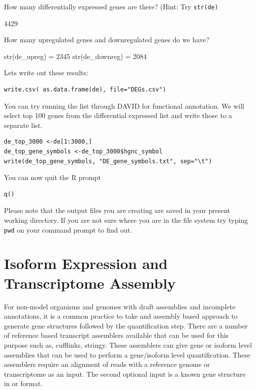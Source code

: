 \begin{questions}
How many differentially expressed genes are there? (Hint: Try \texttt{str(de)}
\begin{answer}
4429
\end{answer}

How many upregulated genes and downregulated genes do we have?
\begin{answer}
str(de\_upreg) = 2345
str(de\_downreg) = 2084
\end{answer}

\end{questions}

\begin{steps}
Lets write out these results:
\begin{lstlisting}
write.csv( as.data.frame(de), file="DEGs.csv")
\end{lstlisting}
You can try running the list through DAVID for functional annotation.
We will select top 100 genes from the differential expressed list and write those to a separate list.

\begin{lstlisting}
de_top_3000 <-de[1:3000,]
de_top_gene_symbols <-de_top_3000$hgnc_symbol
write(de_top_gene_symbols, "DE_gene_symbols.txt", sep="\t")
\end{lstlisting}

You can now quit the R prompt
\begin{lstlisting}
q()
\end{lstlisting}
\end{steps}

\begin{note}
Please note that the output files you are creating are saved in your present working directory. If you are not sure where you are in the file system try typing \texttt{pwd} on your command prompt to find out.
\end{note}



\newpage
\section{Isoform Expression and Transcriptome Assembly}

\begin{information}
For non-model organisms and genomes with draft assemblies and incomplete annotations, it is a common practice to take and assembly based approach to generate gene structures followed by the quantification step. There are a number of reference based transcript assemblers available that can be used for this purpose such as, cufflinks, stringy. These assemblers can give gene or isoform level assemblies that can be used to perform a gene/isoform level quantification. These assemblers require an alignment of reads with a reference genome or transcriptome as an input. The second optional input is a known gene structure in  or  format. 
\end{information}

